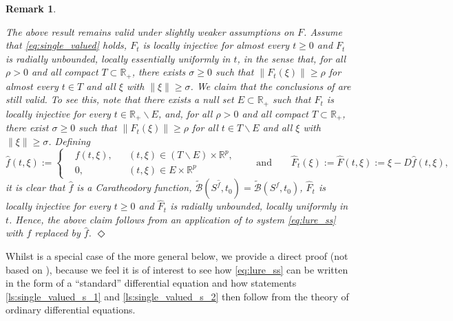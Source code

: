 \documentclass[a4paper,11pt]{article}
\newcommand{\R}{\mathbb R}
\newcommand{\sB}{{\mathcal B}}
\numberwithin{equation}{section}
\numberwithin{figure}{section}
\numberwithin{table}{section}
\newtheorem{remark}[theorem]{Remark}
\begin{document}
\begin{remark}\label{rem:a.e.}
\begin{rm}
The above result remains valid under slightly weaker assumptions on $F$. Assume that \eqref{eq:single_valued} holds, $F_t$ is locally injective for almost every $t\geq 0$
and $F_t$ is radially unbounded, {\it locally essentially uniformly in $t$}, in the sense
that, for all $\rho>0$ and all compact $T\subset\R_+$, there exists $\sigma\geq 0$ such that $\|F_t(\xi)\|\geq\rho$ for almost every $t\in T$ and all $\xi$ with $\|\xi\|\geq\sigma$.
We claim that the conclusions of 
are still valid. To see this, note that there exists a null set $E\subset\R_+$ such that
$F_t$ is locally injective for every $t\in\R_+\backslash E$, and, for all $\rho>0$ and all compact $T\subset\R_+$, there exist $\sigma\geq 0$ such that $\|F_t(\xi)\|\geq\rho$ for all $t\in T\backslash E$ and all $\xi$ with $\|\xi\|\geq\sigma$. Defining
\[
\hat f(t,\xi):=\left\{ \begin{aligned} & f(t,\xi), & & (t,\xi)\in(T\backslash E)\times\R^p, \\
& 0, & & (t,\xi)\in E\times\R^p
\end{aligned}\right.\qquad\mbox{and}\qquad
\hat F_t(\xi):=\hat F(t,\xi):=\xi-D\hat f(t,\xi),
\]
it is clear that $\hat f$ is a Caratheodory function, $\tilde\sB(S^{\hat f},t_0)=
\tilde\sB(S^f,t_0)$, $\hat F_t$ is locally injective
for every $t\geq 0$ and $\hat F_t$ is radially unbounded, locally uniformly in $t$. Hence, the above claim follows from an application of  to system \eqref{eq:lure_ss} with $f$ replaced by $\hat f$.
\hfill$\Diamond$
\end{rm}
\end{remark}
%
Whilst  is a special case of the more general  below,  we provide a direct proof (not based on ), because we feel it
is of interest to see how \eqref{eq:lure_ss} can be written in the form of a ``standard'' differential equation and how statements \ref{ls:single_valued_s_1} and \ref{ls:single_valued_s_2} then follow from the theory of ordinary differential equations.
\end{document}
